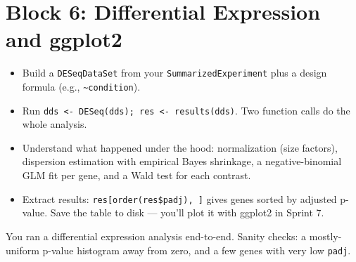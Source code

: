 \section{Block 6: Differential Expression and ggplot2}

\begin{itemize}[nosep]
  \item Build a \texttt{DESeqDataSet} from your \texttt{SummarizedExperiment} plus a design formula (e.g., \texttt{\textasciitilde condition}).
  \item Run \texttt{dds <- DESeq(dds); res <- results(dds)}. Two function calls do the whole analysis.
  \item Understand what happened under the hood: normalization (size factors), dispersion estimation with empirical Bayes shrinkage, a negative-binomial GLM fit per gene, and a Wald test for each contrast.
  \item Extract results: \texttt{res[order(res\$padj), ]} gives genes sorted by adjusted p-value. Save the table to disk --- you'll plot it with ggplot2 in Sprint 7.
\end{itemize}
\begin{winbox}[Checkpoint]
You ran a differential expression analysis end-to-end. Sanity checks: a mostly-uniform p-value histogram away from zero, and a few genes with very low \texttt{padj}.
\end{winbox}

